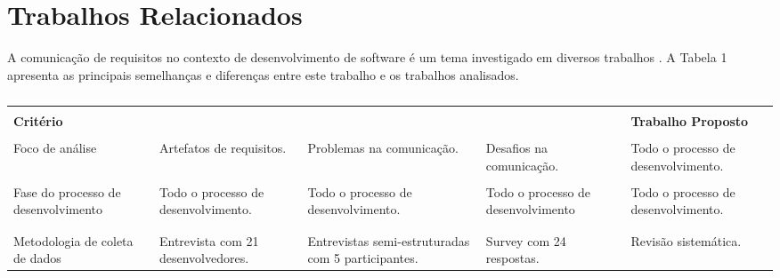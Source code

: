 \chapter{Trabalhos Relacionados}
\label{cap:trabalhos-relacionados}



A comunicação de requisitos no contexto de desenvolvimento de software é um tema investigado em diversos trabalhos \cite{liskin2015artifacts, Maquison, coughlan}. A Tabela 1 apresenta as principais semelhanças e diferenças entre este trabalho e os trabalhos analisados.    

\begin{table}[h]
\centering
\caption{}
\begin{center}
\scriptsize
\label{diferenca_trabalhos}

\begin{tabular}{|p{2.5cm}|p{2.2cm}|p{2.0cm}|p{2.0cm}|p{2.0cm}| }
\hline
\rowcolor{} & & & & 
\\
\rowcolor{} \textbf{Critério}&\textbf{\cite{liskin2015artifacts}}&\textbf{\cite{coughlan}}&\textbf{\cite{Maquison}} &\textbf{Trabalho Proposto} \\

\hline
& & & &  \\
Foco de análise &Artefatos de requisitos. & Problemas na comunicação. &Desafios na comunicação. &Todo o processo de desenvolvimento.  \\


\hline
& & & & \\
Fase do processo de desenvolvimento &Todo o processo de desenvolvimento. &Todo o processo de desenvolvimento. &Todo o processo de desenvolvimento &Todo o processo de desenvolvimento. \\
& & & & \\
\hline
& & & & \\
Metodologia de coleta de dados &Entrevista com 21 desenvolvedores. &Entrevistas semi-estruturadas com 5 participantes. &Survey com 24 respostas. &Revisão sistemática. \\
\hline


\end{tabular} 
\legend {\fontsize{10}{12}\selectfont {Fonte: Elaborado pela autor.}}
\end{center}
\end{table}

    
